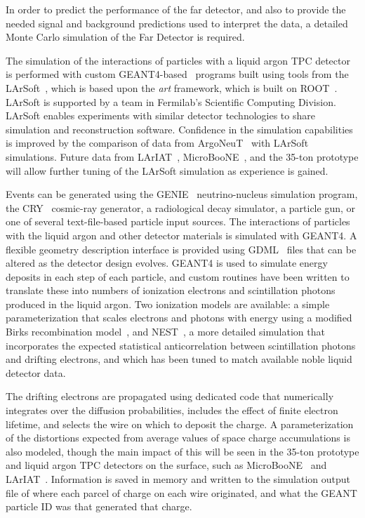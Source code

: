 In order to predict the performance of the far detector, and also to
provide the needed signal and background predictions used to interpret
the data, a detailed Monte Carlo simulation of the Far Detector is
required.

The simulation of the interactions of particles with a liquid argon
TPC detector is performed with custom GEANT4-based~\cite{geant4}
programs built using tools from the LArSoft~\cite{larsoft}, which is
based upon the {\it art} framework, which is built on 
ROOT~\cite{root}.  LArSoft is supported by a team in Fermilab's
Scientific Computing Division.  LArSoft enables experiments with
similar detector technologies to share simulation and reconstruction
software.  Confidence in the simulation capabilities is improved by
the comparison of data from ArgoNeuT~\cite{argoneut} with LArSoft
simulations.  Future data from LArIAT~\cite{lariat},
MicroBooNE~\cite{microboone}, and the 35-ton prototype will allow
further tuning of the LArSoft simulation as experience is gained.

Events can be generated using the GENIE~\cite{genie} neutrino-nucleus
simulation program, the CRY~\cite{cry} cosmic-ray generator, a
radiological decay simulator, a particle gun, or one of several
text-file-based particle input sources.  The interactions of particles
with the liquid argon and other detector materials is simulated with
GEANT4.  A flexible geometry description interface is provided using
GDML~\cite{gdml} files that can be altered as the detector design
evolves.  GEANT4 is used to simulate energy deposits in each step of
each particle, and custom routines have been written to translate
these into numbers of ionization electrons and scintillation photons
produced in the liquid argon.  Two ionization models are available: a
simple parameterization that scales electrons and photons with energy
using a modified Birks recombination model~\cite{birks}, and
NEST~\cite{nest}, a more detailed simulation that incorporates the
expected statistical anticorrelation between scintillation photons and
drifting electrons, and which has been tuned to match available noble
liquid detector data.

The drifting electrons are propagated using dedicated code that
numerically integrates over the diffusion probabilities, includes the
effect of finite electron lifetime, and selects the wire on which to
deposit the charge.  A parameterization of the distortions expected
from average values of space charge accumulations is also modeled,
though the main impact of this will be seen in the 35-ton prototype
and liquid argon TPC detectors on the surface, such as
MicroBooNE~\cite{microboone} and LArIAT~\cite{lariat}.  Information is
saved in memory and written to the simulation output file of where
each parcel of charge on each wire originated, and what the GEANT
particle ID was that generated that charge.

